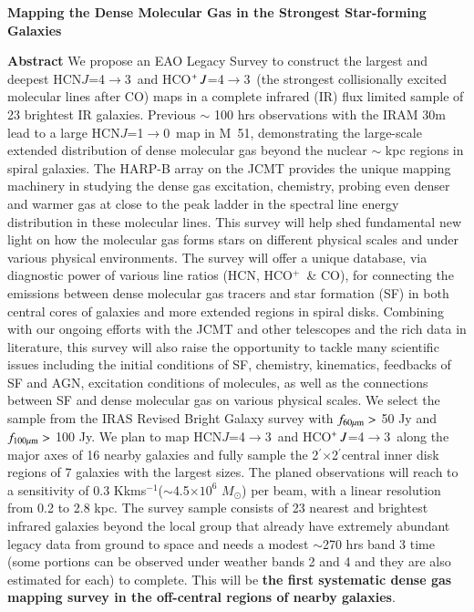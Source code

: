 \documentclass[legal,11pt]{article}
\def\kms    {\ifmmode{{\rm \ts km\ts s}^{-1}}\else{\ts km\ts s$^{-1}$}\fi}
\def\kms    {km\,s$^{-1}$\,}
\def\arcmin {\hbox{$^{\prime}$}}
\def\Kkms{K\,\kms }
\def\,{\thinspace}
\def\Msun{$M_\odot$}
\def\HCOP       {HCO$^{+}$}
\def\HCNoz      {HCN\,$J$=1$\rightarrow$0}
\def\HCNft        {HCN\,$J$=4$\rightarrow$3}
\def\HCOPft     {HCO$^+\,J$=4$\rightarrow$3}
\begin{document}
\begin{center}
        {\large\bf Mapping the Dense Molecular Gas in the Strongest Star-forming Galaxies}


\vspace { 0.5 cm}
 {\Large\bf Abstract} 
\justify
{{We propose an EAO Legacy Survey to construct the largest and deepest \HCNft\
        and \HCOPft\ (the strongest collisionally excited molecular lines after
        CO) maps in a complete infrared (IR) flux limited sample of 23
        brightest IR galaxies. Previous $\sim$ 100 hrs observations with the
        IRAM 30m lead to a large \HCNoz\ map in M~51, demonstrating the
        large-scale extended distribution of dense molecular gas beyond the
        nuclear $\sim$ kpc regions in spiral galaxies. The HARP-B array on the
        JCMT provides the unique mapping machinery in studying the dense gas
        excitation, chemistry, probing even denser and warmer gas at close to
        the peak ladder in the spectral line energy distribution in these
        molecular lines.  This survey will help shed fundamental new light on
        how the molecular gas forms stars on different physical scales and
        under various physical environments.  The survey will offer a unique
        database, via diagnostic power of various line ratios (HCN, \HCOP\ \&
        CO),  for connecting the emissions between dense molecular gas tracers
        and star formation (SF) in both central cores of galaxies and more
        extended regions in spiral disks.  Combining with our ongoing efforts
        with the JCMT and other telescopes and the rich data in literature,
        this survey will also raise the opportunity to tackle many scientific
        issues including the initial conditions of SF, chemistry, kinematics,
        feedbacks of SF and AGN, excitation conditions of molecules, as well as
        the connections between SF and dense molecular gas on various physical
        scales. We select the sample from the IRAS Revised Bright Galaxy survey
        with $f_{\rm 60\mu m}>$ 50 Jy and $f_{\rm 100\mu m}>$ 100 Jy.  We plan
        to map \HCNft\ and \HCOPft\ along the major axes of 16 nearby galaxies
        and fully sample the 2\arcmin$\times$2\arcmin central inner disk
        regions of 7 galaxies with the largest sizes. The planed observations
        will reach to a sensitivity of 0.3 \Kkms ($\sim$4.5$\times10^6$ \Msun)
        per beam, with a linear resolution from 0.2 to 2.8 kpc.  The survey
        sample consists of 23 nearest and brightest infrared galaxies beyond
        the local group that already have  extremely abundant legacy data from
        ground to space and needs a modest $\sim$270 hrs band 3 time (some
        portions can be observed under weather bands 2 and 4 and they are also
        estimated for each) to complete.  This will be {\bf the first
        systematic dense gas mapping survey in the off-central regions of
nearby galaxies}. }}

\end{center}
\end{document}

